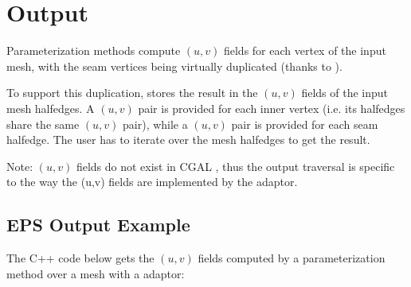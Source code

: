 \section{Output}

Parameterization methods compute $(u,v)$ fields for each vertex
of the input mesh, with the seam vertices being virtually duplicated (thanks
to ).

To support this duplication,
 stores
the result in the $(u,v)$ fields of the input mesh halfedges.
A $(u,v)$ pair is provided for
each inner vertex (i.e. its halfedges share the same $(u,v)$ pair),
while a $(u,v)$ pair is provided for each seam halfedge.
The user has to iterate over the mesh halfedges to get the result.

Note: $(u,v)$ fields do not exist in CGAL ,
thus the output traversal is specific to the way the (u,v) fields are implemented by the adaptor.

\subsection{EPS Output Example}

The C++ code below gets the $(u,v)$ fields computed by a
parameterization method over a  mesh with a
 adaptor:

